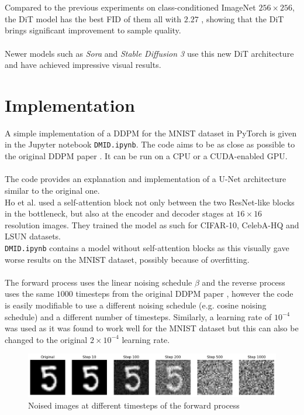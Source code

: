 \documentclass[twoside]{article}
\numberwithin{equation}{section}
\numberwithin{figure}{section}
\begin{document}
\\\\
Compared to the previous experiments on class-conditioned ImageNet $256 \times 256$, the DiT model has the best FID of them all with $2.27$ \cite{peebles2023scalable}, showing that the DiT brings significant improvement to sample quality.
\\\\
Newer models such as \textit{Sora} \cite{videoworldsimulators2024} and \textit{Stable Diffusion 3} use this new DiT architecture and have achieved impressive visual results.

\newpage
\section{Implementation}
A simple implementation of a DDPM for the MNIST dataset in PyTorch is given in the Jupyter notebook \texttt{DMID.ipynb}. The code aims to be as close as possible to the original DDPM paper \cite{ho2020denoising}. It can be run on a CPU or a CUDA-enabled GPU.
\\\\
The code provides an explanation and implementation of a U-Net architecture similar to the original one. \\
Ho et al. used a self-attention block not only between the two ResNet-like blocks in the bottleneck, but also at the encoder and decoder stages at $16 \times 16$ resolution images. They trained the model as such for CIFAR-10, CelebA-HQ and LSUN datasets. \cite{ho2020denoising} \\
\texttt{DMID.ipynb} contains a model without self-attention blocks as this visually gave worse results on the MNIST dataset, possibly because of overfitting.
\\\\
The forward process uses the linear noising schedule $\beta$ and the reverse process uses the same $1000$ timesteps from the original DDPM paper \cite{ho2020denoising}, however the code is easily modifiable to use a different noising schedule (e.g. cosine noising schedule) and a different number of timesteps. Similarly, a learning rate of $10^{-4}$ was used as it was found to work well for the MNIST dataset but this can also be changed to the original $2 \times 10^{-4}$ learning rate.
\begin{figure}[h]
  \begin{center}
    \includegraphics[width=\textwidth]{images/forward.png}
    \caption{Noised images at different timesteps of the forward process}
  \end{center}
\end{figure}
\end{document}
